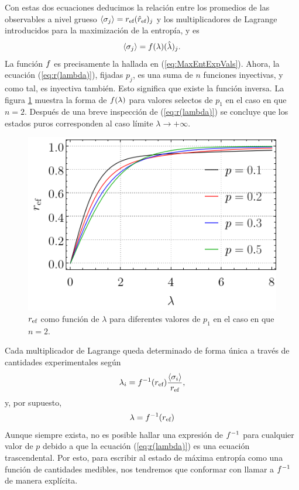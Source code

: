 
Con estas dos ecuaciones deducimos la relación entre los promedios de las observables a nivel grueso $\expval{\sigma_{j}}=r_{\text{ef}}(\hat{r}_{\text{ef}})_{j}$ y los multiplicadores de Lagrange introducidos para la maximización de la entropía, y es
\begin{equation}
    \expval{\sigma_{j}}=f(\lambda)(\hat{\lambda})_{j}.
\end{equation}
La función $f$ es precisamente la hallada en (\ref{eq:MaxEntExpVals}). Ahora, la ecuación (\ref{eq:r(lambda)}), fijadas $p_{j}$, es una suma de $n$ funciones inyectivas, y como tal, es inyectiva también. Esto significa que existe la función inversa. La figura \ref{fig:r(lambda)} muestra la forma de $f(\lambda)$ para valores selectos de $p_{1}$ en el caso en que $n=2$. Después de una breve inspección de (\ref{eq:r(lambda)}) se concluye que los estados puros corresponden al caso límite $\lambda\rightarrow+\infty$.

\begin{figure}[ht]
    \centering
    \includegraphics[width=0.5\linewidth]{chapter2/figures/r(lambda).png}
    \caption{$r_{\text{ef}}$ como función de $\lambda$ para diferentes valores de $p_{1}$ en el caso en que $n=2$.}
    \label{fig:r(lambda)}
\end{figure}
Cada multiplicador de Lagrange queda determinado de forma única a través de cantidades experimentales según 
\begin{equation}
    \lambda_{i}=f^{-1}(r_{\text{ef}}) \frac{\expval{\sigma_{i}}}{r_{\text{ef}}},
\end{equation}
y, por supuesto,
\begin{equation}
    \lambda=f^{-1}(r_{\text{ef}})\nonumber
\end{equation}
Aunque siempre exista, no es posible hallar una expresión de $f^{-1}$ para cualquier valor de $p$ debido a que la ecuación (\ref{eq:r(lambda)}) es una ecuación trascendental. Por esto, para escribir al estado de máxima entropía como una función de cantidades medibles, nos tendremos que conformar con llamar a $f^{-1}$ de manera explícita.


